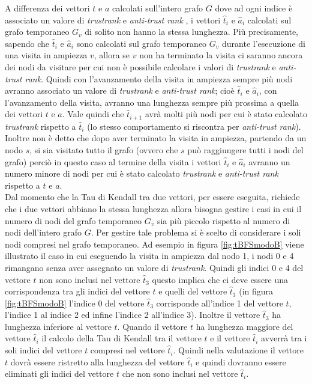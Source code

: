 A differenza dei vettori \(t\) e \(a\) calcolati sull'intero grafo \(G\) dove ad ogni indice è associato un valore di \textit{trustrank} e \textit{anti-trust rank} , i vettori \(\hat{t}_i\) e \(\hat{a}_i\) calcolati sul grafo temporaneo \(G_v\) di solito non hanno la stessa lunghezza. Più precisamente, sapendo che \(\hat{t}_i\) e \(\hat{a}_i\) sono calcolati sul grafo temporaneo \(G_v\) durante l'esecuzione di una visita in ampiezza \(v\), allora se \(v\) non ha terminato la visita ci saranno ancora dei nodi da visitare per cui non è possibile calcolare i valori di \textit{trustrank} e \textit{anti-trust rank}. Quindi con l'avanzamento della visita in ampiezza sempre più nodi avranno associato un valore di \textit{trustrank} e \textit{anti-trust rank}; cioè \(\hat{t}_i\) e \(\hat{a}_i\), con l'avanzamento della visita, avranno una lunghezza sempre più prossima a quella dei vettori \(t\) e \(a\). Vale quindi che \(\hat{t}_{i+1}\) avrà molti più nodi per cui è stato calcolato \textit{trustrank} rispetto a \(\hat{t}_i\) (lo stesso comportamento si riscontra per \textit{anti-trust rank}). Inoltre non è detto che dopo aver terminato la visita in ampiezza, partendo da un nodo \(s\), si sia visitato tutto il grafo (ovvero che \(s\) può raggiungere tutti i nodi del grafo) perciò in questo caso al termine della visita i vettori \(\hat{t}_i\) e \(\hat{a}_i\) avranno un numero minore di nodi per cui è stato calcolato \textit{trustrank} e \textit{anti-trust rank} rispetto a \(t\) e \(a\).\\
Dal momento che la Tau di Kendall tra due vettori, per essere eseguita, richiede che i due vettori abbiano la stessa lunghezza allora bisogna gestire i casi in cui il numero di nodi del grafo temporaneo \(G_v\) sia più piccolo rispetto al numero di nodi dell'intero grafo \(G\).  Per gestire tale problema si è scelto di considerare i soli nodi compresi nel grafo temporaneo. Ad esempio in figura \ref{fig:tBFSmodoB} viene illustrato il caso in cui eseguendo la visita in ampiezza dal nodo 1, i nodi 0 e 4 rimangano senza aver assegnato un valore di \textit{trustrank}. Quindi gli indici 0 e 4 del vettore \(t\) non sono inclusi nel vettore \(\hat{t}_3\) questo implica che ci deve essere una corrispondenza tra gli indici del vettore \(t\) e quelli del vettore \(\hat{t}_3\) (in figura \ref{fig:tBFSmodoB} l'indice 0 del vettore \(\hat{t}_3\) corrisponde all'indice 1 del vettore \(t\), l'indice 1 al indice 2 ed infine l'indice 2 all'indice 3).  Inoltre  il vettore \(\hat{t}_3\) ha lunghezza inferiore al vettore \(t\). 
Quando il vettore \(t\) ha lunghezza maggiore del vettore \(\hat{t}_i\) il calcolo della Tau di Kendall tra il vettore \(t\) e il vettore \(\hat{t}_i\) avverrà tra i soli indici del vettore \(t\) compresi nel vettore \(\hat{t}_i\). Quindi  nella valutazione  il vettore \(t\) dovrà essere ristretto alla lunghezza del vettore \(\hat{t}_i\) e quindi dovranno essere eliminati gli indici del vettore \(t\) che non sono inclusi nel vettore \(\hat{t}_i\).
